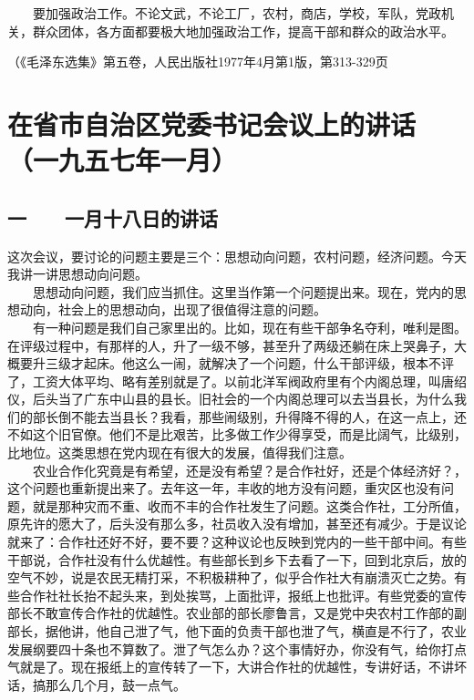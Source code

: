 \documentclass[cn,11pt,chinese]{elegantbook}
\def\myformat#1{\hfil\hfil #1}
\begin{document}
　　要加强政治工作。不论文武，不论工厂，农村，商店，学校，军队，党政机关，群众团体，各方面都要极大地加强政治工作，提高干部和群众的政治水平。\\
\begin{flushright}（《毛泽东选集》第五卷，人民出版社1977年4月第1版，第313-329页\end{flushright}
\newpage\section*{\myformat{在省市自治区党委书记会议上的讲话}\\\myformat{（一九五七年一月）}}
\subsection*{\myformat{一　　一月十八日的讲话}}
这次会议，要讨论的问题主要是三个：思想动向问题，农村问题，经济问题。今天我讲一讲思想动向问题。\\
　　思想动向问题，我们应当抓住。这里当作第一个问题提出来。现在，党内的思想动向，社会上的思想动向，出现了很值得注意的问题。\\
　　有一种问题是我们自己家里出的。比如，现在有些干部争名夺利，唯利是图。在评级过程中，有那样的人，升了一级不够，甚至升了两级还躺在床上哭鼻子，大概要升三级才起床。他这么一闹，就解决了一个问题，什么干部评级，根本不评了，工资大体平均、略有差别就是了。以前北洋军阀政府里有个内阁总理，叫唐绍仪，后头当了广东中山县的县长。旧社会的一个内阁总理可以去当县长，为什么我们的部长倒不能去当县长？我看，那些闹级别，升得降不得的人，在这一点上，还不如这个旧官僚。他们不是比艰苦，比多做工作少得享受，而是比阔气，比级别，比地位。这类思想在党内现在有很大的发展，值得我们注意。\\
　　农业合作化究竟是有希望，还是没有希望？是合作社好，还是个体经济好？，这个问题也重新提出来了。去年这一年，丰收的地方没有问题，重灾区也没有问题，就是那种灾而不重、收而不丰的合作社发生了问题。这类合作社，工分所值，原先许的愿大了，后头没有那么多，社员收入没有增加，甚至还有减少。于是议论就来了：合作社还好不好，要不要？这种议论也反映到党内的一些干部中间。有些干部说，合作社没有什么优越性。有些部长到乡下去看了一下，回到北京后，放的空气不妙，说是农民无精打采，不积极耕种了，似乎合作社大有崩溃灭亡之势。有些合作社社长抬不起头来，到处挨骂，上面批评，报纸上也批评。有些党委的宣传部长不敢宣传合作社的优越性。农业部的部长廖鲁言，又是党中央农村工作部的副部长，据他讲，他自己泄了气，他下面的负责干部也泄了气，横直是不行了，农业发展纲要四十条也不算数了。泄了气怎么办？这个事情好办，你没有气，给你打点气就是了。现在报纸上的宣传转了一下，大讲合作社的优越性，专讲好话，不讲坏话，搞那么几个月，鼓一点气。\\
\end{document}
